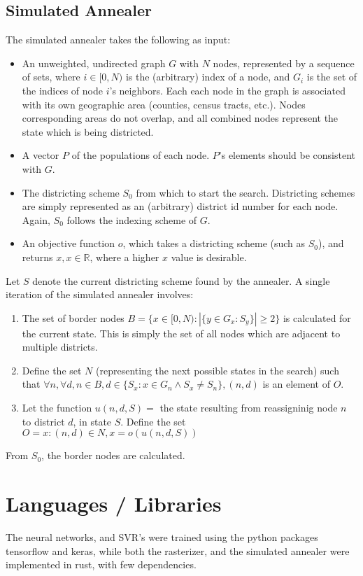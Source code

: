\documentclass{article}
\begin{document}
\subsection{Simulated Annealer}
The simulated annealer takes the following as input:
\begin{itemize}
    \item An unweighted, undirected graph $G$ with $N$ nodes, represented by a sequence of sets, where $i\in[0, N)$ is the (arbitrary) index of a node, and $G_i$ is the set of the indices of node $i$'s neighbors. Each each node in the graph is associated with its own geographic area (counties, census tracts, etc.). Nodes corresponding areas do not overlap, and all combined nodes represent the state which is being districted.
    \item A vector $P$ of the populations of each node. $P$'s elements should be consistent with $G$.
    \item The districting scheme $S_0$ from which to start the search. Districting schemes are simply represented as an (arbitrary) district id number for each node. Again, $S_0$ follows the indexing scheme of $G$.
    \item An objective function $o$, which takes a districting scheme (such as $S_0$), and returns $x, x\in\mathbb{R}$, where a higher $x$ value is desirable.
\end{itemize}
Let $S$ denote the current districting scheme found by the annealer. A single iteration of the simulated annealer involves:
\begin{enumerate}
    \item The set of border nodes $B=\{x\in[0, N): |\{y\in G_x: S_y\}|\geq2\}$ is calculated for the current state. This is simply the set of all nodes which are adjacent to multiple districts.
    \item Define the set $N$ (representing the next possible states in the search) such that $\forall n, \forall d, n \in B, d\in \{S_x: x\in G_n\land S_x\neq S_n\}, (n, d)$ is an element of $O$.
    \item Let the function $u(n, d, S)=$ the state resulting from reassigninig node $n$ to district $d$, in state $S$. Define the set $O = {x: (n, d)\in N, x=o(u(n, d, S))}$
\end{enumerate}
From $S_0$, the border nodes are calculated.

\section{Languages / Libraries}
The neural networks, and SVR's were trained using the python packages tensorflow and keras, while both the rasterizer, and the simulated annealer were implemented in rust, with few dependencies.
\end{document}
